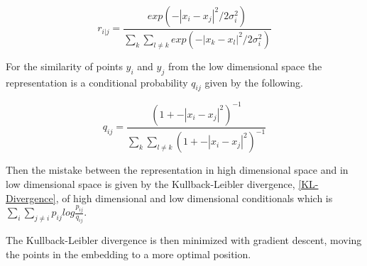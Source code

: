 \begin{equation} \label{pij}
    r_{i|j}=\frac{exp(-|x_{i}-x_{j}|^2/2\sigma_{i}^2)}{\sum_{k}\sum_{l\neq k} exp(-|x_{k}-x_{l}|^2/2\sigma_{i}^2)}
\end{equation}

For the similarity of points $y_{i}$ and $y_{j}$ from the low dimensional space the representation is a conditional
probability $q_{ij}$ given by the following.

\begin{equation} \label{qij}
    q_{ij}=\frac{(1 + -|x_{i}-x_{j}|^2)^{-1}}{\sum_{k}\sum_{l\neq k} (1 + -|x_{i}-x_{j}|^2)^{-1}}
\end{equation}

Then the mistake between the representation in high dimensional space and in low dimensional space is
given by the Kullback-Leibler divergence, \autoref{KL-Divergence}, of high dimensional and low dimensional
conditionals which is $\sum_{i}\sum_{j\neq i}p_{ij}log \frac{p_{ij}}{q_{ij}}$.

The Kullback-Leibler divergence is then minimized with gradient descent, moving the points in the embedding to
a more optimal position.